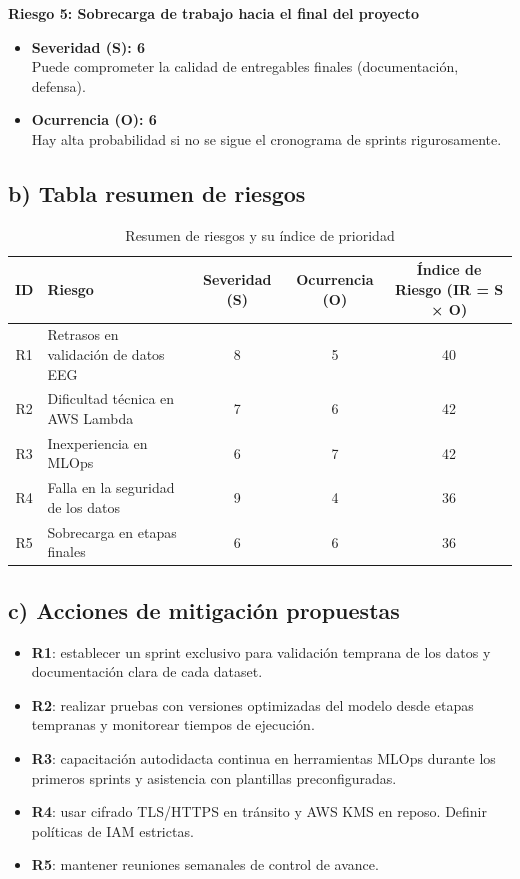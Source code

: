 \documentclass[
11pt, %
]{charter}
\begin{document}
\textbf{Riesgo 5: Sobrecarga de trabajo hacia el final del proyecto}
\begin{itemize}
    \item \textbf{Severidad (S): 6} \\
    Puede comprometer la calidad de entregables finales (documentación, defensa).
    \item \textbf{Ocurrencia (O): 6} \\
    Hay alta probabilidad si no se sigue el cronograma de sprints rigurosamente.
\end{itemize}

\subsection*{b) Tabla resumen de riesgos}

\begin{table}[H]
\centering
\begin{tabularx}{\linewidth}{|c|X|c|c|c|}
\hline
\rowcolor[HTML]{C0C0C0}
\textbf{ID} & \textbf{Riesgo} & \textbf{Severidad (S)} & \textbf{Ocurrencia (O)} & \textbf{Índice de Riesgo (IR = S × O)} \\
\hline
R1 & Retrasos en validación de datos EEG & 8 & 5 & 40 \\
\hline
R2 & Dificultad técnica en AWS Lambda & 7 & 6 & 42 \\
\hline
R3 & Inexperiencia en MLOps & 6 & 7 & 42 \\
\hline
R4 & Falla en la seguridad de los datos & 9 & 4 & 36 \\
\hline
R5 & Sobrecarga en etapas finales & 6 & 6 & 36 \\
\hline
\end{tabularx}
\caption{Resumen de riesgos y su índice de prioridad}
\end{table}

\vspace{0.5cm}

\subsection*{c) Acciones de mitigación propuestas}

\begin{itemize}
  \item \textbf{R1}: establecer un sprint exclusivo para validación temprana de los datos y documentación clara de cada dataset.
  \item \textbf{R2}: realizar pruebas con versiones optimizadas del modelo desde etapas tempranas y monitorear tiempos de ejecución.
  \item \textbf{R3}: capacitación autodidacta continua en herramientas MLOps durante los primeros sprints y asistencia con plantillas preconfiguradas.
  \item \textbf{R4}: usar cifrado TLS/HTTPS en tránsito y AWS KMS en reposo. Definir políticas de IAM estrictas.
  \item \textbf{R5}: mantener reuniones semanales de control de avance.
\end{itemize}
\end{document}
